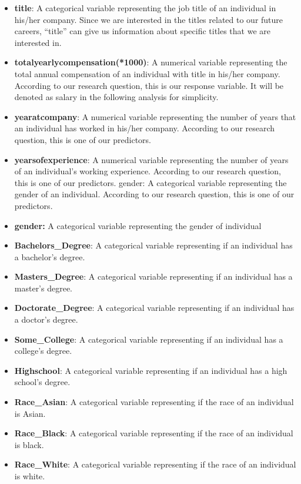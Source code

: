 \documentclass[
]{article}
\begin{document}
\begin{itemize}
\item
  \textbf{title}: A categorical variable representing the job title of
  an individual in his/her company. Since we are interested in the
  titles related to our future careers, ``title'' can give us
  information about specific titles that we are interested in.
\item
  \textbf{totalyearlycompensation(*1000)}: A numerical variable
  representing the total annual compensation of an individual with title
  in his/her company. According to our research question, this is our
  response variable. It will be denoted as salary in the following
  analysis for simplicity.
\item
  \textbf{yearatcompany}: A numerical variable representing the number
  of years that an individual has worked in his/her company. According
  to our research question, this is one of our predictors.
\item
  \textbf{yearsofexperience}: A numerical variable representing the
  number of years of an individual's working experience. According to
  our research question, this is one of our predictors. gender: A
  categorical variable representing the gender of an individual.
  According to our research question, this is one of our predictors.
\item
  \textbf{gender:} A categorical variable representing the gender of
  individual
\item
  \textbf{Bachelors\_Degree}: A categorical variable representing if an
  individual has a bachelor's degree.
\item
  \textbf{Masters\_Degree}: A categorical variable representing if an
  individual has a master's degree.
\item
  \textbf{Doctorate\_Degree}: A categorical variable representing if an
  individual has a doctor's degree.
\item
  \textbf{Some\_College}: A categorical variable representing if an
  individual has a college's degree.
\item
  \textbf{Highschool}: A categorical variable representing if an
  individual has a high school's degree.
\item
  \textbf{Race\_Asian}: A categorical variable representing if the race
  of an individual is Asian.
\item
  \textbf{Race\_Black}: A categorical variable representing if the race
  of an individual is black.
\item
  \textbf{Race\_White}: A categorical variable representing if the race
  of an individual is white.

  \newpage
\end{itemize}
\end{document}
